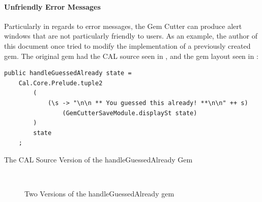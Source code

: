 \paragraph{Unfriendly Error Messages}

Particularly in regards to error messages, the Gem Cutter can produce alert windows that are not particularly friendly to users.  As an example, the author of this document once tried to modify the implementation of a previously created gem.  The original gem had the CAL source seen in , and the gem layout seen in :

\begin{program}
\begin{verbatim}
public handleGuessedAlready state =
    Cal.Core.Prelude.tuple2
        (
            (\s -> "\n\n ** You guessed this already! **\n\n" ++ s)
                (GemCutterSaveModule.displaySt state)
        )
        state
    ;
\end{verbatim}
\caption{The CAL Source Version of the handleGuessedAlready Gem}
\label{prog:handleGuessedAlready}
\end{program}


\begin{figure}[htp]
  \begin{center}
    \\
  \end{center}
  \caption{Two Versions of the handleGuessedAlready gem}
  \label{fig:handleGuessedAlready}
\end{figure}

